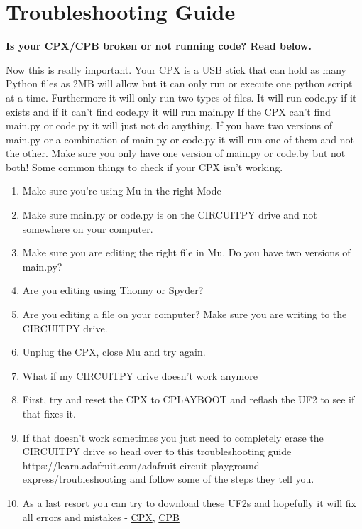 \section{Troubleshooting Guide}

{\bf Is your CPX/CPB broken or not running code? Read below.}

Now this is really important. Your CPX is a USB stick that can hold as
many Python files as 2MB will allow but it can only run or execute one
python script at a time. Furthermore it will only run two types of
files. It will run code.py if it exists and if it can't find code.py
it will run main.py If the CPX can't find main.py or code.py it will
just not do anything. If you have two versions of main.py or a
combination of main.py or code.py it will run one of them and not the
other. Make sure you only have one version of main.py or code.by but
not both! Some common things to check if your CPX isn't working.

\begin{enumerate}[itemsep=-5pt]
  \item Make sure you're using Mu in the right Mode
  \item Make sure main.py or code.py is on the CIRCUITPY drive and not somewhere on your computer.
  \item Make sure you are editing the right file in Mu. Do you have two versions of main.py?
  \item Are you editing using Thonny or Spyder?
  \item Are you editing a file on your computer? Make sure you are writing to the CIRCUITPY drive.
  \item Unplug the CPX, close Mu and try again.
  \item What if my CIRCUITPY drive doesn’t work anymore
  \item First, try and reset the CPX to CPLAYBOOT and reflash the UF2 to see if that fixes it.
  \item If that doesn’t work sometimes you just need to completely erase the CIRCUITPY drive so head over to this troubleshooting guide https://learn.adafruit.com/adafruit-circuit-playground-express/troubleshooting and follow some of the steps they tell you.
  \item As a last resort you can try to download these UF2s and
    hopefully it will fix all errors and mistakes -
    \href{https://cdn-learn.adafruit.com/assets/assets/000/048/745/original/flash_erase_express.ino.circuitplay.uf2?1512152080}{CPX}, \href{https://cdn-learn.adafruit.com/assets/assets/000/082/950/original/CP_Bluefruit_QSPI_Erase.UF2?1572026649}{CPB}
\end{enumerate}
